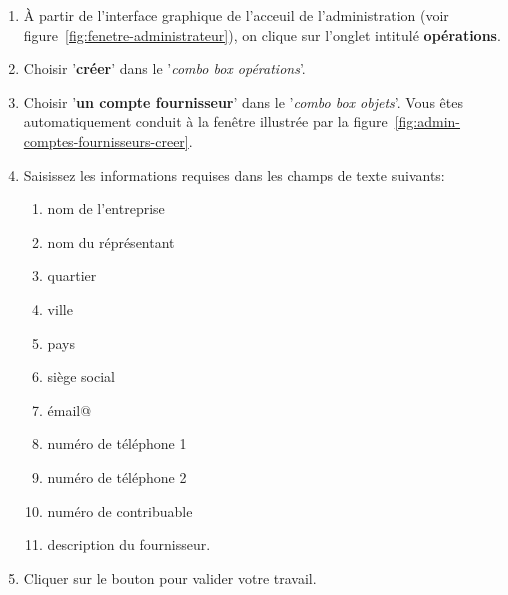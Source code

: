 \begin{enumerate}[1)]
	\item \`A partir de l'interface graphique de l'acceuil de
		l'administration (voir figure~\ref{fig:fenetre-administrateur}),
		on clique sur l'onglet intitul\'e \textbf{op\'erations}. 
		
	\item Choisir '\textbf{cr\'eer}' dans le '\emph{combo box
		op\'erations}'.
		
	\item Choisir '\textbf{un compte fournisseur}' dans
		le '\emph{combo box objets}'. Vous \^etes automatiquement
		conduit \`a la fen\^etre illustr\'ee par la
		figure~\ref{fig:admin-comptes-fournisseurs-creer}.
		
	\item Saisissez les informations requises dans les champs de texte
		suivants:
		\begin{enumerate}[1)]
			\item nom de l'entreprise
			\item nom du r\'epr\'esentant \optionel
			\item quartier \optionel
			\item ville \optionel
			\item pays \optionel
			\item si\`ege social \optionel
			\item \'email@ \optionel
			\item num\'ero de t\'el\'ephone 1 \optionel
			\item num\'ero de t\'el\'ephone 2 \optionel
			\item num\'ero de contribuable \optionel
			\item description du fournisseur. \optionel			
		\end{enumerate}
		
	\item Cliquer sur le bouton  pour
		valider votre travail.		
\end{enumerate}


\newpage
{}

